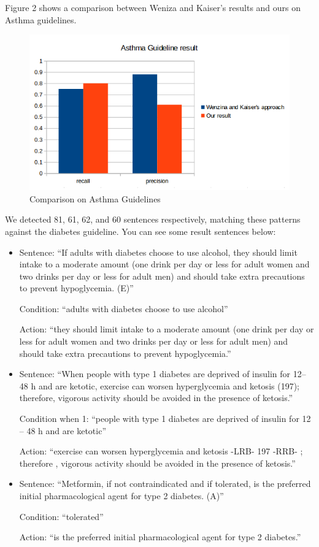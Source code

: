 \documentclass[12pt,letterpaper]{article}
\begin{document}
Figure 2 shows a comparison between Weniza and Kaiser's results and ours on Asthma guidelines.
\begin{figure}
\includegraphics[width=\textwidth]{Comparison}
\caption{Comparison on Asthma Guidelines}
\end{figure}

We detected 81, 61, 62, and 60 sentences respectively, matching these patterns against the diabetes guideline. You can see some result sentences below:

\begin{itemize}
\item Sentence: ``If adults with diabetes choose to use alcohol, they should limit intake to a moderate amount (one drink per day or less for adult women and two drinks per  day or less for  adult men) and should take extra precautions to prevent hypoglycemia. (E)''

Condition: ``adults with diabetes choose to use alcohol''

Action: ``they should limit intake to a moderate amount (one drink per day or less for adult women and two drinks per day or less for adult men) and should take extra precautions to prevent hypoglycemia.''

\item Sentence: ``When people with type 1 diabetes are deprived of insulin for 12– 48 h and are ketotic, exercise can worsen hyperglycemia and ketosis (197); therefore, vigorous activity should be avoided in the presence of ketosis.''

Condition when 1: ``people with type 1 diabetes are deprived of insulin for 12 -- 48 h and are ketotic''

Action: ``exercise can worsen hyperglycemia and ketosis -LRB- 197 -RRB- ; therefore , vigorous activity should be avoided in the presence of ketosis.''

\item Sentence: ``Metformin, if not contraindicated and if tolerated, is the preferred initial pharmacological agent for type 2 diabetes. (A)''

Condition: ``tolerated''

Action: ``is the preferred initial pharmacological agent for type 2 diabetes.''
\end{itemize}
\end{document}
